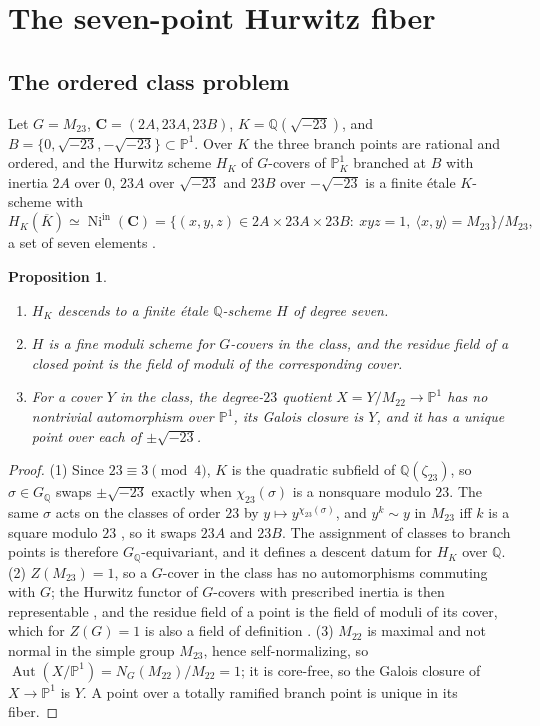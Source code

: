 \documentclass[11pt]{amsart}
\newcommand{\QQ}{\mathbb{Q}}
\newcommand{\PP}{\mathbb{P}}
\newcommand{\GQ}{G_{\QQ}}
\newcommand{\Mtw}{M_{23}}
\newcommand{\sqm}{\sqrt{-23}}
\newcommand{\Ni}{\operatorname{Ni}}
\newcommand{\Aut}{\operatorname{Aut}}
\newcommand{\Cc}{\mathbf C}
\theoremstyle{plain}
\newtheorem{proposition}[theorem]{Proposition}
\theoremstyle{definition}
\begin{document}
\section{The seven-point Hurwitz fiber}\label{sec:fiber}

\subsection{The ordered class problem}\label{sec:ordered}

Let $G=\Mtw$, $\Cc=(2A,23A,23B)$, $K=\QQ(\sqm)$, and
$B=\{0,\sqm,-\sqm\}\subset\PP^1$. Over $K$ the three branch points are
rational and ordered, and the Hurwitz scheme $H_K$ of $G$-covers of
$\PP^1_K$ branched at $B$ with inertia $2A$ over $0$, $23A$ over $\sqm$
and $23B$ over $-\sqm$ is a finite \'etale $K$-scheme with
\[
  H_K(\overline K)\simeq\Ni^{\mathrm{in}}(\Cc)
  =\bigl\{(x,y,z)\in 2A\times23A\times23B:\ xyz=1,\
  \langle x,y\rangle=\Mtw\bigr\}/\Mtw ,
\]
a set of seven elements \cite{HJLPPZ,seven}.

\begin{proposition}\label{prop:descent}
\begin{enumerate}
\item $H_K$ descends to a finite \'etale $\QQ$-scheme $H$ of degree
seven.
\item $H$ is a fine moduli scheme for $G$-covers in the class, and the
residue field of a closed point is the field of moduli of the
corresponding cover.
\item For a cover $Y$ in the class, the degree-$23$ quotient
$X=Y/M_{22}\to\PP^1$ has no nontrivial automorphism over $\PP^1$, its
Galois closure is $Y$, and it has a unique point over each of $\pm\sqm$.
\end{enumerate}
\end{proposition}
\begin{proof}
(1) Since $23\equiv3\pmod4$, $K$ is the quadratic subfield of
$\QQ(\zeta_{23})$, so $\sigma\in\GQ$ swaps $\pm\sqm$ exactly when
$\chi_{23}(\sigma)$ is a nonsquare modulo $23$. The same $\sigma$ acts
on the classes of order $23$ by $y\mapsto y^{\chi_{23}(\sigma)}$, and
$y^k\sim y$ in $\Mtw$ iff $k$ is a square modulo $23$
\cite{ATLAS}, so it swaps $23A$ and $23B$. The assignment of classes to
branch points is therefore $\GQ$-equivariant, and it defines a descent
datum for $H_K$ over $\QQ$.
(2) $Z(\Mtw)=1$, so a $G$-cover in the class has no automorphisms
commuting with $G$; the Hurwitz functor of $G$-covers with prescribed
inertia is then representable \cite{Fulton,RomagnyWewers}, and the
residue field of a point is the field of moduli of its cover, which
for $Z(G)=1$ is also a field of definition \cite{DebesDouai}.
(3) $M_{22}$ is maximal and not normal in the simple group $\Mtw$,
hence self-normalizing, so $\Aut(X/\PP^1)=N_G(M_{22})/M_{22}=1$; it is
core-free, so the Galois closure of $X\to\PP^1$ is $Y$. A point over
a totally ramified branch point is unique in its fiber.
\end{proof}
\end{document}
